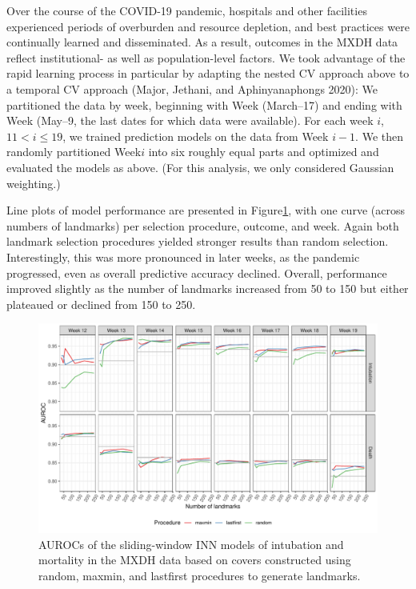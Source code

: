 \documentclass{article}
\begin{document}
Over the course of the COVID-19 pandemic, hospitals and other facilities
experienced periods of overburden and resource depletion, and best
practices were continually learned and disseminated. As a result,
outcomes in the MXDH data reflect institutional- as well as
population-level factors. We took advantage of the rapid learning
process in particular by adapting the nested CV approach above to a
temporal CV approach (Major, Jethani, and Aphinyanaphongs 2020): We
partitioned the data by week, beginning with Week
(March--17) and ending with Week (May--9, the last
dates for which data were available). For each week \(i\),
\(11 < i \leq 19\), we trained prediction models on the data from Week
\(i-1\). We then randomly partitioned Week\nbs\(i\) into six roughly
equal parts and optimized and evaluated the models as above. (For this
analysis, we only considered Gaussian weighting.)

Line plots of model performance are presented in
Figure\nbs\ref{fig:knn-mx}, with one curve (across numbers of landmarks)
per selection procedure, outcome, and week. Again both landmark
selection procedures yielded stronger results than random selection.
Interestingly, this was more pronounced in later weeks, as the pandemic
progressed, even as overall predictive accuracy declined. Overall,
performance improved slightly as the number of landmarks increased from
50 to 150 but either plateaued or declined from 150 to 250.

\begin{figure}
\includegraphics[width=\textwidth]{knn-auc-mx-gaussian}
\caption{
AUROCs of the sliding-window INN models of intubation and mortality in the MXDH data based on covers constructed using random, maxmin, and lastfirst procedures to generate landmarks.
\label{fig:knn-mx}
}
\end{figure}
\end{document}
